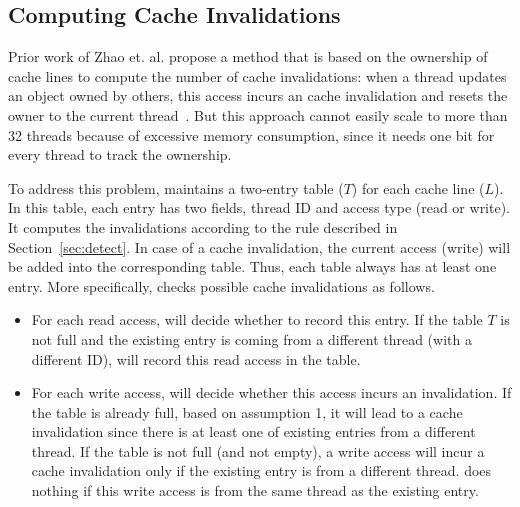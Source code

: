 \subsection{Computing Cache Invalidations}
\label{sec:computeinvalidations}

Prior work of Zhao et. al. propose a method that is based on the ownership of cache lines to compute the number of cache invalidations: when a thread updates an object owned by others, this access incurs an cache invalidation and resets the owner to the current thread~\cite{qinzhao}. But this approach cannot easily scale to more than 32 threads because of excessive memory consumption, since it needs one bit for every thread to track the ownership.  

To address this problem, \Cheetah{} maintains a two-entry table ($T$) for each cache line ($L$). In this table, each entry has two fields, thread ID and access type (read or write). It computes the invalidations according to the rule described in Section~\ref{sec:detect}. In case of a cache invalidation, the current access (write) will be added into the corresponding table. Thus, each table always has at least one entry. More specifically, \cheetah{} checks possible cache invalidations as follows.

\begin{itemize}
\item
For each read access, \cheetah{} will decide whether to record this entry. If the table $T$ is not full and the existing entry is coming from a different thread (with a different ID), \cheetah{} will record this read access in the table.
  
  \item
  For each write access, \cheetah{} will decide whether this access incurs an invalidation. If the table is already full, based on assumption 1, it will lead to a cache invalidation since there is at least one of existing entries from a different thread. If the table is not full (and not empty), a write access will incur a cache invalidation only if the existing entry is from a different thread. \cheetah{} does nothing if this write access is from the same thread as the existing entry. 
  
\end{itemize}
     
